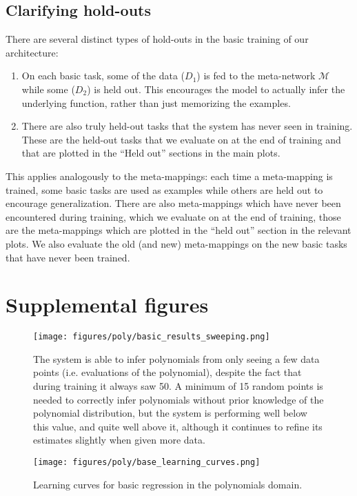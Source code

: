 \subsection{Clarifying hold-outs} \label{app_clarifying_holdouts}
There are several distinct types of hold-outs in the basic training of our architecture:
\begin{enumerate}
\item On each basic task, some of the data ($D_1$) is fed to the meta-network $\mathcal{M}$ while some ($D_2$) is held out. This encourages the model to actually infer the underlying function, rather than just memorizing the examples.
\item There are also truly held-out tasks that the system has never seen in training. These are the held-out tasks that we evaluate on at the end of training and that are plotted in the ``Held out'' sections in the main plots.
\end{enumerate}
This applies analogously to the meta-mappings: each time a meta-mapping is trained, some basic tasks are used as examples while others are held out to encourage generalization. There are also meta-mappings which have never been encountered during training, which we evaluate on at the end of training, those are the meta-mappings which are plotted in the ``held out'' section in the relevant plots. We also evaluate the old (and new) meta-mappings on the new basic tasks that have never been trained. \par

\section{Supplemental figures} \label{app_supp_figures}
\begin{figure}[H]
\centering
\texttt{[image: figures/poly/basic\_results\_sweeping.png]}
\caption{The system is able to infer polynomials from only seeing a few data points (i.e. evaluations of the polynomial), despite the fact that during training it always saw 50. A minimum of 15 random points is needed to correctly infer polynomials without prior knowledge of the polynomial distribution, but the system is performing well below this value, and quite well above it, although it continues to refine its estimates slightly when given more data.}
\label{supp_poly_sweep_results}
\end{figure}

\begin{figure}[H]
\centering
\texttt{[image: figures/poly/base\_learning\_curves.png]}
\caption{Learning curves for basic regression in the polynomials domain.}
\label{supp_poly_basic_learning_curves}
\end{figure}

